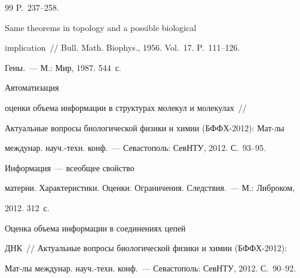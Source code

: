 {{\begin{thebibliography}{99}
   P.~237--258.


   




    Same theorems in topology and a possible biological 


implication~/\!\!/ Bull. Math. Biophys., 1956. Vol.~17. P.~111--126.







    Гены.~--- М.: Мир, 1987. 544~с.







    Автоматизация 


оценки объема информации в структурах молекул и молекулах~/\!\!/ 


Актуальные вопросы биологической физики и химии (БФФХ-2012): Мат-лы 


междунар. науч.-техн. конф.~--- Севастополь: СевНТУ, 2012. С.~93--95. 







    Информация~--- всеобщее свойство 


материи. Характеристики. Оценки. Ограничения. Следствия.~--- М.: Либроком, 


2012. 312~с.





 \label{end\stat}


 




    Оценка объема информации в соединениях цепей 


ДНК~/\!\!/ Актуальные вопросы биологической физики и химии (БФФХ-2012): 


Мат-лы междунар. науч.-техн. конф.~--- Севастополь: СевНТУ, 2012. С.~90--92.


   


 \end{thebibliography}


}


}


